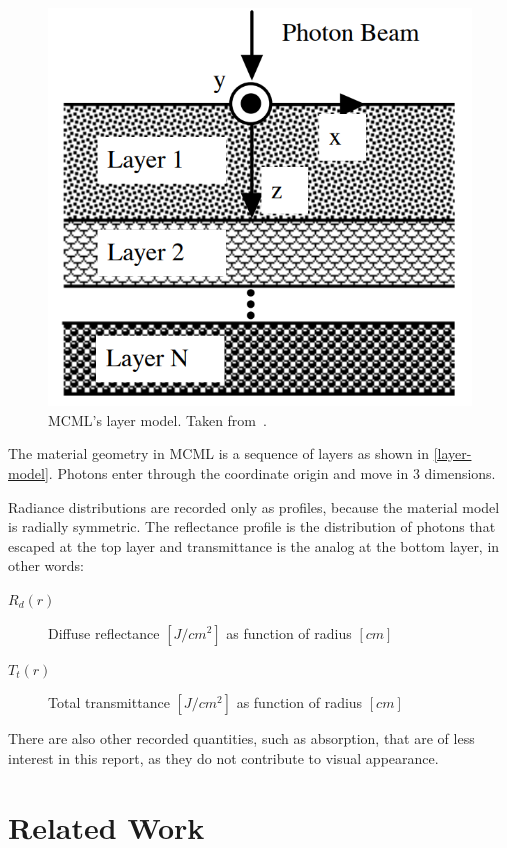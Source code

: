\documentclass[]{article}
\begin{document}
\begin{figure}[ht!]
	\includegraphics[width=\linewidth]{img/layer-model.png}
	\caption{MCML's layer model. Taken from~\cite{wang1992monte}.}
	\label{layer-model}
\end{figure}

The material geometry in MCML is a sequence of layers as shown in \autoref{layer-model}. Photons enter through the coordinate origin and move in 3 dimensions.

Radiance distributions are recorded only as profiles, because the material model is radially symmetric. The reflectance profile is the distribution of photons that escaped at the top layer and transmittance is the analog at the bottom layer, in other words:

\begin{description}
	\item[$R_d(r)$] Diffuse reflectance $[J/cm^2]$ as function of radius $[cm]$
	\item[$T_t(r)$] Total transmittance $[J/cm^2]$ as function of radius $[cm]$
\end{description}

There are also other recorded quantities, such as absorption, that are of less interest in this report, as they do not contribute to visual appearance.

\section{Related Work}
\end{document}
